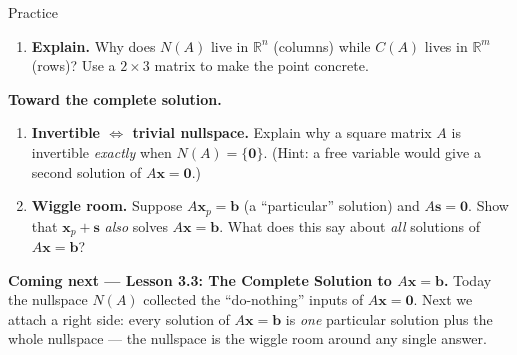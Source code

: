 \documentclass[10pt]{article}
\newcommand{\xx}{\mathbf{x}}
\newcommand{\bb}{\mathbf{b}}
\newcommand{\svec}{\mathbf{s}}
\newcommand{\zero}{\mathbf{0}}
\begin{document}
\begin{notesbox}{Practice}
\begin{enumerate}[leftmargin=1.9em, itemsep=11pt]
        is in the nullspace of $A=\begin{bmatrix} 1 & 2 & 5 \\ 3 & 6 & 1 \end{bmatrix}$, then say what it
        tells you about the \emph{columns} of $A$. 
  \item \textbf{Explain.} Why does $N(A)$ live in $\mathbb{R}^n$ (columns) while $C(A)$ lives in
        $\mathbb{R}^m$ (rows)? Use a $2\times3$ matrix to make the point concrete. 
\end{enumerate}
\end{notesbox}

\begin{extensionbox}
\textbf{Toward the complete solution.}
\begin{enumerate}[label=(\alph*), leftmargin=1.8em, itemsep=5pt]
  \item \textbf{Invertible $\Leftrightarrow$ trivial nullspace.} Explain why a square matrix $A$ is
        invertible \emph{exactly} when $N(A)=\{\zero\}$. (Hint: a free variable would give a second
        solution of $A\xx=\zero$.)
  \item \textbf{Wiggle room.} Suppose $A\xx_p=\bb$ (a ``particular'' solution) and $A\svec=\zero$.
        Show that $\xx_p+\svec$ \emph{also} solves $A\xx=\bb$. What does this say about \emph{all}
        solutions of $A\xx=\bb$?
\end{enumerate}
\end{extensionbox}

\begin{spiralbox}
\textbf{Coming next --- Lesson 3.3: The Complete Solution to $A\xx=\bb$.} Today the nullspace $N(A)$
collected the ``do-nothing'' inputs of $A\xx=\zero$. Next we attach a right side: every solution of
$A\xx=\bb$ is \emph{one} particular solution plus the whole nullspace --- the nullspace is the wiggle
room around any single answer.
\end{spiralbox}
\end{document}
